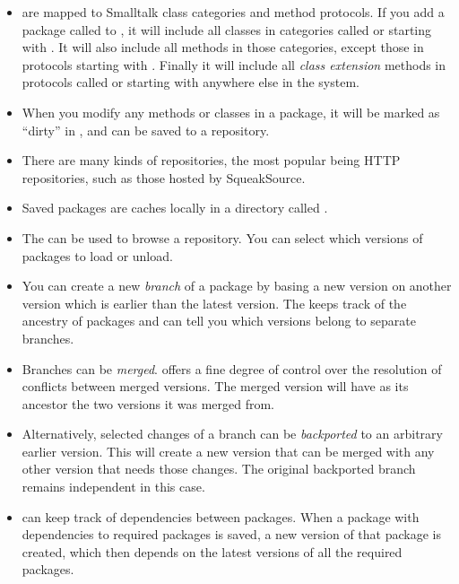 \documentclass[a4paper,10pt,twoside]{book}
\begin{document}
\begin{itemize}
\item \MC are mapped to Smalltalk class categories and method protocols.
	If you add a package called  to \MC, it will include all classes in categories called  or starting with . It will also include all methods in those categories, except those in protocols starting with \ct{*}. Finally it will include all \emph{class extension} methods in protocols called  or starting with  anywhere else in the system.

\item When you modify any methods or classes in a package, it will be marked as ``dirty'' in \MC, and can be saved to a repository.

\item There are many kinds of repositories, the most popular being HTTP repositories, such as those hosted by SqueakSource.

\item Saved packages are caches locally in a directory called .

\item The \MC \RI can be used to browse a repository. You can select which versions of packages to load or unload.

\item You can create a new \emph{branch} of a package by basing a new version on another version which is earlier than the latest version. The \RI keeps track of the ancestry of packages and can tell you which versions belong to separate branches.

\item Branches can be \emph{merged}. \MC offers a fine degree of control over the resolution of conflicts between merged versions. The merged version will have as its ancestor the two versions it was merged from.

\item Alternatively, selected changes of a branch can be \emph{backported} to an arbitrary earlier version. This will create a new version that can be merged with any other version that needs those changes. The original backported branch remains independent in this case.

\item \MC can keep track of dependencies between packages. When a package with dependencies to required packages is saved, a new version of that package is created, which then depends on the latest versions of all the required packages.


\end{itemize}
\end{document}
